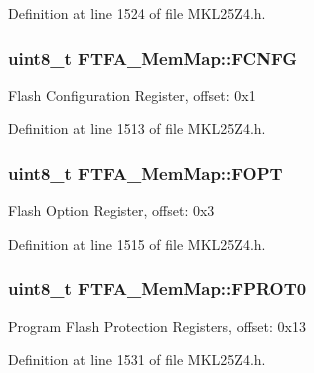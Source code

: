 Definition at line 1524 of file M\+K\+L25\+Z4.\+h.

\subsubsection[{\texorpdfstring{F\+C\+N\+FG}{FCNFG}}]{\setlength{\rightskip}{0pt plus 5cm}uint8\+\_\+t F\+T\+F\+A\+\_\+\+Mem\+Map\+::\+F\+C\+N\+FG}\hypertarget{struct_f_t_f_a___mem_map_a8b566226492c86d3c48607e0d72f61db}{}\label{struct_f_t_f_a___mem_map_a8b566226492c86d3c48607e0d72f61db}
Flash Configuration Register, offset\+: 0x1 

Definition at line 1513 of file M\+K\+L25\+Z4.\+h.

\subsubsection[{\texorpdfstring{F\+O\+PT}{FOPT}}]{\setlength{\rightskip}{0pt plus 5cm}uint8\+\_\+t F\+T\+F\+A\+\_\+\+Mem\+Map\+::\+F\+O\+PT}\hypertarget{struct_f_t_f_a___mem_map_add71f9fca54238033c0b928c740e8398}{}\label{struct_f_t_f_a___mem_map_add71f9fca54238033c0b928c740e8398}
Flash Option Register, offset\+: 0x3 

Definition at line 1515 of file M\+K\+L25\+Z4.\+h.

\subsubsection[{\texorpdfstring{F\+P\+R\+O\+T0}{FPROT0}}]{\setlength{\rightskip}{0pt plus 5cm}uint8\+\_\+t F\+T\+F\+A\+\_\+\+Mem\+Map\+::\+F\+P\+R\+O\+T0}\hypertarget{struct_f_t_f_a___mem_map_aba5bfab2704e58af5ecacdb6b7faccbc}{}\label{struct_f_t_f_a___mem_map_aba5bfab2704e58af5ecacdb6b7faccbc}
Program Flash Protection Registers, offset\+: 0x13 

Definition at line 1531 of file M\+K\+L25\+Z4.\+h.

